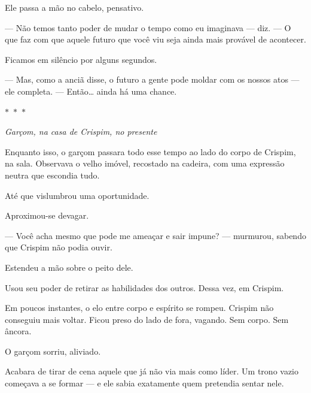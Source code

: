 Ele passa a mão no cabelo, pensativo.

— Não temos tanto poder de mudar o tempo como eu imaginava — diz. — O que faz com que aquele futuro que você viu seja ainda mais provável de acontecer.

Ficamos em silêncio por alguns segundos.

— Mas, como a anciã disse, o futuro a gente pode moldar com os nossos atos — ele completa. — Então… ainda há uma chance.

\begin{center}
  $\ast$~$\ast$~$\ast$

  \textit{Garçom, na casa de Crispim, no presente}
\end{center}
   
Enquanto isso, o garçom passara todo esse tempo ao lado do corpo de Crispim, na sala.
Observava o velho imóvel, recostado na cadeira, com uma expressão neutra que escondia tudo.

Até que vislumbrou uma oportunidade.

Aproximou-se devagar.

— Você acha mesmo que pode me ameaçar e sair impune? — murmurou, sabendo que Crispim não podia ouvir.

Estendeu a mão sobre o peito dele.

Usou seu poder de retirar as habilidades dos outros.  
Dessa vez, em Crispim.

Em poucos instantes, o elo entre corpo e espírito se rompeu.  
Crispim não conseguiu mais voltar.  
Ficou preso do lado de fora, vagando.  
Sem corpo.  
Sem âncora.

O garçom sorriu, aliviado.

Acabara de tirar de cena aquele que já não via mais como líder.
Um trono vazio começava a se formar — e ele sabia exatamente quem pretendia sentar nele.
